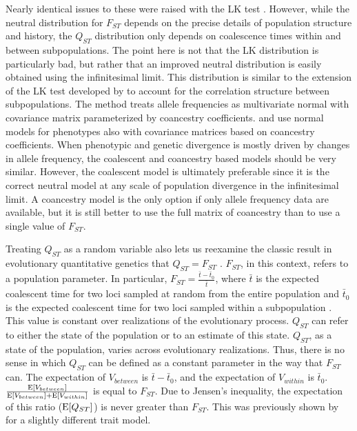 Nearly identical issues to these were raised with the LK test
\citep{Nei1975,Robertson1975}. However, while the neutral distribution for
$F_{ST}$ depends on the precise details of population structure and history, the
$Q_{ST}$ distribution only depends on coalescence times within and between
subpopulations. The point here is not that the LK distribution is particularly
bad, but rather that an improved neutral distribution is easily obtained using
the infinitesimal limit. This distribution is similar to the extension of the LK
test developed by \citet{Bonhomme2010} to account for the correlation structure
between subpopulations. The \citet{Bonhomme2010} method treats allele
frequencies as multivariate normal with covariance matrix parameterized by
coancestry coefficients. \citet{Ovaskainen2011} and \citet{Berg2014} use normal
models for phenotypes also with covariance matrices based on coancestry
coefficients. When phenotypic and genetic divergence is mostly driven by changes
in allele frequency, the coalescent and coancestry based models should be very
similar. However, the coalescent model is ultimately preferable since it is the
correct neutral model at any scale of population divergence in the infinitesimal
limit. A coancestry model is the only option if only allele frequency data are
available, but it is still better to use the full matrix of coancestry than to
use a single value of $F_{ST}$.

Treating $Q_{ST}$ as a random variable also lets us reexamine the classic result
in evolutionary quantitative genetics that $Q_{ST}=F_{ST}$ \citep{Whitlock1999}.
$F_{ST}$, in this context, refers to a population parameter. In particular,
$F_{ST} = \frac{\bar{t} - \bar{t}_0}{\bar{t}}$, where $\bar{t}$ is the expected
coalescent time for two loci sampled at random from the entire population and
$\bar{t}_0$ is the expected coalescent time for two loci sampled within a
subpopulation \citep{Slatkin1991}. This value is constant over realizations of
the evolutionary process. $Q_{ST}$ can refer to either the state of the
population or to an estimate of this state. $Q_{ST}$, as a state of the
population, varies across evolutionary realizations. Thus, there is no sense in
which $Q_{ST}$ can be defined as a constant parameter in the way that $F_{ST}$
can. The expectation of $V_{between}$ is $\bar{t} - \bar{t}_0$, and the
expectation of $V_{within}$ is $\bar{t}_0$.
$\frac{\mathrm{E}[V_{between}]}{\mathrm{E}[V_{between}] + \mathrm{E}[V_{within}]}$ is equal to $F_{ST}$.
Due to Jensen's inequality, the expectation of this ratio ($\mathrm{E}[Q_{ST}]$) is
never greater than $F_{ST}$. This was previously shown by \citet{Edge2015} for a
slightly different trait model.

